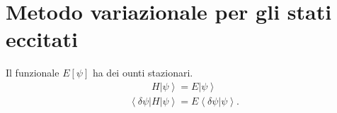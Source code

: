 \section{Metodo variazionale per gli stati eccitati} %
Il funzionale $E\left[\psi \right]$ ha dei ounti stazionari.
\begin{equation}\begin{split}
H\left |\psi  \right\rangle=E\left |\psi  \right\rangle
\end{split}\end{equation}
\begin{equation}\begin{split}
\left\langle \delta\psi |H|\psi  \right\rangle=E\left\langle \delta\psi |\psi  \right\rangle.
\end{split}\end{equation}